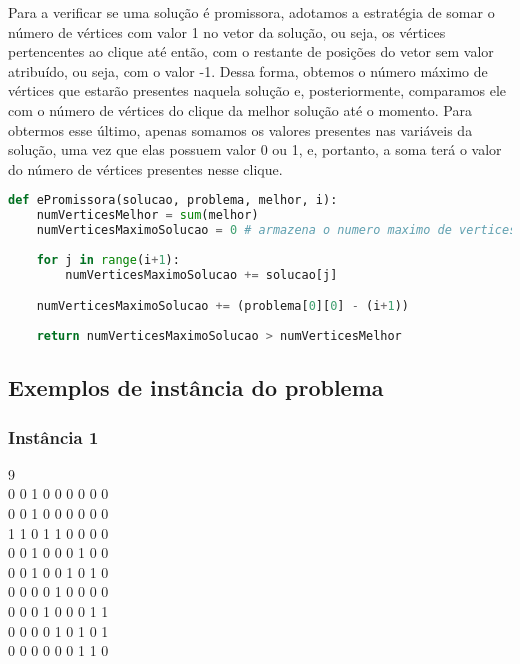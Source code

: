 \documentclass[12pt]{article}
\begin{document}
  \par Para a verificar se uma solução é promissora, adotamos a estratégia de somar o número de vértices com valor 1 no vetor da solução, ou seja, os vértices pertencentes ao clique até então, com o restante de posições do vetor sem valor atribuído, ou seja, com o valor -1. Dessa forma, obtemos o número máximo de vértices que estarão presentes naquela solução e, posteriormente, comparamos ele com o número de vértices do clique da melhor solução até o momento. Para obtermos esse último, apenas somamos os valores presentes nas variáveis da solução, uma vez que elas possuem valor 0 ou 1, e, portanto, a soma terá o valor do número de vértices presentes nesse clique.
\begin{lstlisting}[caption={Função que verifica se a solução até o momento é promissora},label={lst:codClique4},language=Python]
def ePromissora(solucao, problema, melhor, i):
    numVerticesMelhor = sum(melhor)
    numVerticesMaximoSolucao = 0 # armazena o numero maximo de vertices possiveis nessa solucao
    
    for j in range(i+1):
        numVerticesMaximoSolucao += solucao[j]

    numVerticesMaximoSolucao += (problema[0][0] - (i+1))
    
    return numVerticesMaximoSolucao > numVerticesMelhor
 \end{lstlisting}

\subsection{Exemplos de instância do problema}
    \subsubsection{Instância 1}
        \begin{tcolorbox}[title=Arquivo de entrada para a instância 1, width=\linewidth, 
          fontupper=\ttfamily, 
          halign=flush left]
            9 \\
            0 0 1 0 0 0 0 0 0 \\
            0 0 1 0 0 0 0 0 0 \\
            1 1 0 1 1 0 0 0 0 \\
            0 0 1 0 0 0 1 0 0 \\
            0 0 1 0 0 1 0 1 0 \\
            0 0 0 0 1 0 0 0 0 \\
            0 0 0 1 0 0 0 1 1 \\
            0 0 0 0 1 0 1 0 1 \\
            0 0 0 0 0 0 1 1 0 \\
        \end{tcolorbox}
\end{document}
